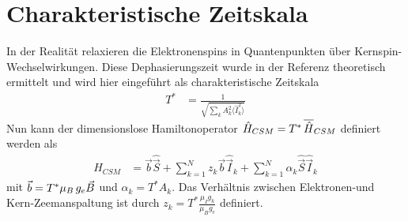 \section{Charakteristische Zeitskala}
In der Realität relaxieren die Elektronenspins in Quantenpunkten über Kernspin-Wechselwirkungen. Diese Dephasierungszeit wurde in der 
Referenz \cite{PhysRevB.65.205309} theoretisch ermittelt und wird hier eingeführt als charakteristische Zeitskala
\begin{align}\label{charakteristische_Zeit}
    T^* &= \frac{1}{\sqrt{\sum_k A_k^2\langle \hat{I}_k^2 \rangle}}
\end{align}
Nun kann der dimensionslose Hamiltonoperator $\hat{H}_{CSM} = T^*\thinspace\overline{\hat{H}}_{CSM}$ definiert werden als
\begin{align}
    \hat{H}_{CSM} &= \vec{b}\hat{\vec{S}} +  \sum_{k=1}^{N}z_k\vec{b}\hat{\vec{I}}_k + \sum_{k=1}^{N} \alpha_k \hat{\vec{S}}\hat{\vec{I}}_k
\end{align}
mit $\vec{b}=T^*\mu_B\thinspace g_e \vec{B}$ und $\alpha_k = T^* A_k$. Das Verhältnis zwischen Elektronen-und Kern-Zeemanspaltung ist 
durch $z_k=T^*\frac{\mu_I g_k}{\mu_B g_e}$ definiert.


